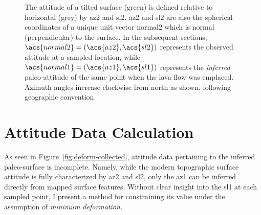 \begin{figure}
    {\caption[Pole to plane $\acs{normal2}=(\acs{az2},\acs{sl2})$]{The attitude of a tilted surface (green) is defined relative to horizontal (grey) by \ac{az2} and \ac{sl2}. \acs{az2} and \acs{sl2} are also the spherical coordinates of a unique unit vector \acs{normal2} which is normal (perpendicular) to the surface. In the subsequent sections, $\acs{normal2}=(\acs{az2},\acs{sl2})$ represents the observed attitude at a sampled location, while $\acs{normal1}=(\acs{az1},\acs{sl1})$ represents the \emph{inferred} paleo-attitude of the same point when the lava flow was emplaced. Azimuth angles increase clockwise from \acf{north} as shown, following geographic convention.}\label{fig:surface}}
    {}
\end{figure}

\section{Attitude Data Calculation}\label{sec:calculation}

As seen in Figure~\ref{fig:deform-collected}, attitude data pertaining to the inferred paleo-surface is incomplete. Namely, while the modern topographic surface attitude is fully characterized by \acs{az2} and \acs{sl2}, only the \acf{az1} can be inferred directly from mapped surface features. Without clear insight into the \acf{sl1} at each sampled point, I present a method for constraining its value under the assumption of \emph{minimum deformation.} 

